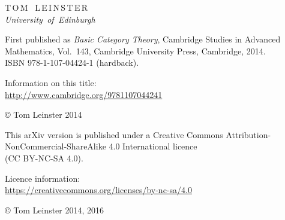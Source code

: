 % 
% 
% 

\thispagestyle{empty}

{\centering
\vspace*{20mm}


\vspace*{12mm}

{\large T\,O\,M \, L\,E\,I\,N\,S\,T\,E\,R}\\
\textit{University \,of \,Edinburgh}

}


\newpage
\thispagestyle{empty}

{\centering\small

First published as \emph{Basic Category Theory}, Cambridge Studies in
Advanced Mathematics, Vol.~143, Cambridge University Press, Cambridge,
2014.\\  
ISBN 978-1-107-04424-1 (hardback).

\bigskip

Information on this title:\\
\href{http://www.cambridge.org/9781107044241}{http://www.cambridge.org/9781107044241}
% 

\bigskip

\copyright{} Tom Leinster 2014


\vspace*{20mm}


This arXiv version is published under a Creative Commons
Attribution-NonCommercial-ShareAlike 4.0 International licence\\ 
(CC BY-NC-SA 4.0).

\bigskip

Licence information:\\
\href{https://creativecommons.org/licenses/by-nc-sa/4.0/}{https://creativecommons.org/licenses/by-nc-sa/4.0}

\bigskip

\copyright{} Tom Leinster 2014, 2016

}

